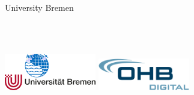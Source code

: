 \begin{titlingpage} %
\thispagestyle{empty} 
\begin{center}
\begin{large}
University Bremen \\
\end{large}
\vspace{4cm} %
\begin{large} 
\textbf{\thetitle} 
\end{large}
\theauthor\\
\thedate \\
\vspace{13cm} %

\includegraphics[width=0.3\textwidth]{img/res/uniLogoIUP.png}
\hspace{4cm}
\includegraphics[width=0.3\textwidth]{img/res/logo_ohb_digital.png}

\end{center}
\end{titlingpage}
